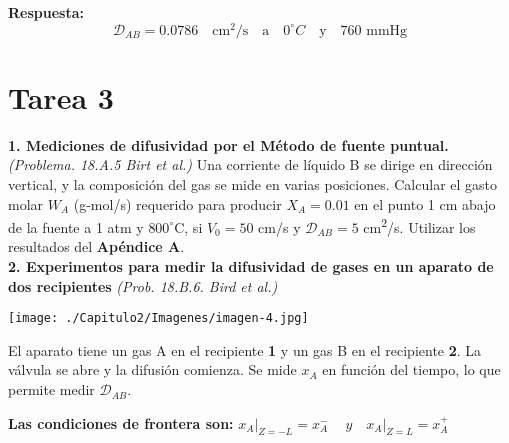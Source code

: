 \textbf{Respuesta:} \[
\mathscr{D}_{AB} = 0.0786 \quad \text{cm}^2/\text{s} \quad \text{a} \quad 0^\circ C \quad \text{y} \quad 760 \text{ mmHg}
\]
\newpage
\section*{Tarea 3}
\vspace{0.3cm} %
\flushleft
\textbf{1. Mediciones de difusividad por el Método de fuente puntual.}\textit{(Problema. 18.A.5 Birt et al.)}
\vspace{0.1cm} %
\flushleft
Una corriente de líquido B se dirige en dirección vertical, y la composición del gas se mide en varias posiciones. Calcular el gasto molar $W_A$ (g-mol/s) requerido para producir $X_A = 0.01$ en el punto 1 cm abajo de la fuente a 1 atm y $800^\circ$C, si $V_0 = 50$ cm/s y $\mathscr{D}_{AB} = 5$ cm\textsuperscript{2}/s. 
\vspace{0.1cm} %
\flushleft
Utilizar los resultados del \textbf{Apéndice A}.\\
\flushleft
\textbf{2. Experimentos para medir la difusividad de gases en un aparato de dos recipientes} \textit{(Prob. 18.B.6. Bird et al.)} 
\flushleft
\begin{minipage}{0.5\textwidth} %
    \texttt{[image: ./Capitulo2/Imagenes/imagen-4.jpg]} %
\end{minipage}
\hfill %
\begin{minipage}{0.45\textwidth} %
El aparato tiene un gas A en el recipiente \textbf{1} y un gas B en el recipiente \textbf{2}.  La válvula se abre y la difusión comienza.  Se mide $x_A$ en función del tiempo, lo que permite medir $\mathscr{D}_{AB}$.
\end{minipage}

\textbf{Las condiciones de frontera son:} \quad
$
x_A \bigg|_{Z=-L}= x_A^- \quad \ y \quad x_A \bigg|_{Z=L}= x_A^+ \quad
$

